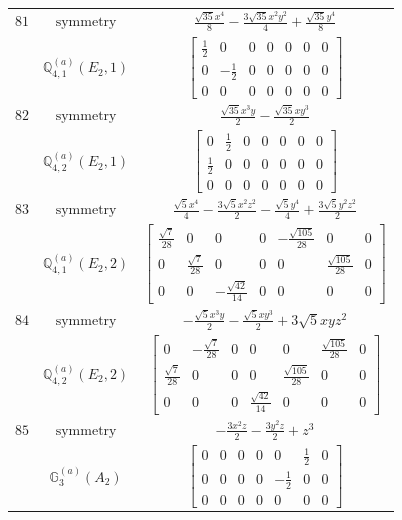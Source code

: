 \documentclass[fleqn,8pt,landscape]{jsarticle}
\begin{document}
\begin{longtable}{ccc}
$ 81 $ & $ \text{symmetry} $ & $ \frac{\sqrt{35} x^{4}}{8} - \frac{3 \sqrt{35} x^{2} y^{2}}{4} + \frac{\sqrt{35} y^{4}}{8} $ \\
$  $ & $ \mathbb{Q}_{4,1}^{(a)}(E_{2},1) $ & $ \begin{bmatrix} \frac{1}{2} & 0 & 0 & 0 & 0 & 0 & 0 \\ 0 & - \frac{1}{2} & 0 & 0 & 0 & 0 & 0 \\ 0 & 0 & 0 & 0 & 0 & 0 & 0 \end{bmatrix} $ \\ \hline
$ 82 $ & $ \text{symmetry} $ & $ \frac{\sqrt{35} x^{3} y}{2} - \frac{\sqrt{35} x y^{3}}{2} $ \\
$  $ & $ \mathbb{Q}_{4,2}^{(a)}(E_{2},1) $ & $ \begin{bmatrix} 0 & \frac{1}{2} & 0 & 0 & 0 & 0 & 0 \\ \frac{1}{2} & 0 & 0 & 0 & 0 & 0 & 0 \\ 0 & 0 & 0 & 0 & 0 & 0 & 0 \end{bmatrix} $ \\ \hline
$ 83 $ & $ \text{symmetry} $ & $ \frac{\sqrt{5} x^{4}}{4} - \frac{3 \sqrt{5} x^{2} z^{2}}{2} - \frac{\sqrt{5} y^{4}}{4} + \frac{3 \sqrt{5} y^{2} z^{2}}{2} $ \\
$  $ & $ \mathbb{Q}_{4,1}^{(a)}(E_{2},2) $ & $ \begin{bmatrix} \frac{\sqrt{7}}{28} & 0 & 0 & 0 & - \frac{\sqrt{105}}{28} & 0 & 0 \\ 0 & \frac{\sqrt{7}}{28} & 0 & 0 & 0 & \frac{\sqrt{105}}{28} & 0 \\ 0 & 0 & - \frac{\sqrt{42}}{14} & 0 & 0 & 0 & 0 \end{bmatrix} $ \\ \hline
$ 84 $ & $ \text{symmetry} $ & $ - \frac{\sqrt{5} x^{3} y}{2} - \frac{\sqrt{5} x y^{3}}{2} + 3 \sqrt{5} x y z^{2} $ \\
$  $ & $ \mathbb{Q}_{4,2}^{(a)}(E_{2},2) $ & $ \begin{bmatrix} 0 & - \frac{\sqrt{7}}{28} & 0 & 0 & 0 & \frac{\sqrt{105}}{28} & 0 \\ \frac{\sqrt{7}}{28} & 0 & 0 & 0 & \frac{\sqrt{105}}{28} & 0 & 0 \\ 0 & 0 & 0 & \frac{\sqrt{42}}{14} & 0 & 0 & 0 \end{bmatrix} $ \\ \hline
$ 85 $ & $ \text{symmetry} $ & $ - \frac{3 x^{2} z}{2} - \frac{3 y^{2} z}{2} + z^{3} $ \\
$  $ & $ \mathbb{G}_{3}^{(a)}(A_{2}) $ & $ \begin{bmatrix} 0 & 0 & 0 & 0 & 0 & \frac{1}{2} & 0 \\ 0 & 0 & 0 & 0 & - \frac{1}{2} & 0 & 0 \\ 0 & 0 & 0 & 0 & 0 & 0 & 0 \end{bmatrix} $ \\ \hline

\end{longtable}
\end{document}
